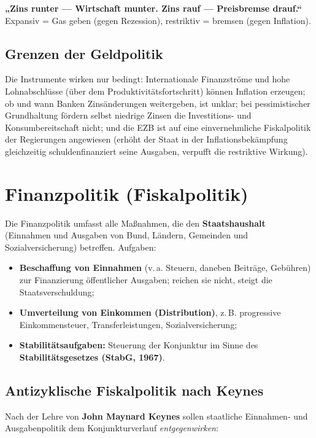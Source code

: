 \documentclass[11pt, a4paper]{article}
\begin{document}
\begin{eselsbruecke}
\textbf{„Zins runter --- Wirtschaft munter. Zins rauf --- Preisbremse drauf.``}
Expansiv = Gas geben (gegen Rezession), restriktiv = bremsen (gegen Inflation).
\end{eselsbruecke}

\subsection{Grenzen der Geldpolitik}

Die Instrumente wirken nur bedingt: Internationale Finanzströme und hohe Lohnabschlüsse
(über dem Produktivitätsfortschritt) können Inflation erzeugen; ob und wann Banken
Zinsänderungen weitergeben, ist unklar; bei pessimistischer Grundhaltung fördern selbst
niedrige Zinsen die Investitions- und Konsumbereitschaft nicht; und die EZB ist auf eine
einvernehmliche Fiskalpolitik der Regierungen angewiesen (erhöht der Staat in der
Inflationsbekämpfung gleichzeitig schuldenfinanziert seine Ausgaben, verpufft die
restriktive Wirkung).

\section{Finanzpolitik (Fiskalpolitik)}

Die Finanzpolitik umfasst alle Maßnahmen, die den \textbf{Staatshaushalt} (Einnahmen und
Ausgaben von Bund, Ländern, Gemeinden und Sozialversicherung) betreffen. Aufgaben:

\begin{itemize}
  \item \textbf{Beschaffung von Einnahmen} (v.\,a. Steuern, daneben Beiträge, Gebühren) zur
    Finanzierung öffentlicher Ausgaben; reichen sie nicht, steigt die Staatsverschuldung;
  \item \textbf{Umverteilung von Einkommen (Distribution)}, z.\,B. progressive
    Einkommensteuer, Transferleistungen, Sozialversicherung;
  \item \textbf{Stabilitätsaufgaben:} Steuerung der Konjunktur im Sinne des
    \textbf{Stabilitätsgesetzes (StabG, 1967)}.
\end{itemize}

\subsection{Antizyklische Fiskalpolitik nach Keynes}

Nach der Lehre von \textbf{John Maynard Keynes} sollen staatliche Einnahmen- und
Ausgabenpolitik dem Konjunkturverlauf \emph{entgegenwirken}:
\end{document}
